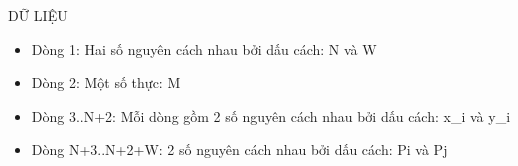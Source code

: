 DỮ LIỆU  
\begin{itemize}
	\item     Dòng 1: Hai số nguyên cách nhau bởi dấu cách: N và W   
	\item     Dòng 2: Một số thực: M   
	\item     Dòng 3..N+2: Mỗi dòng gồm 2 số nguyên cách nhau bởi dấu cách: x\_i         và y\_i   
	\item     Dòng N+3..N+2+W: 2 số nguyên cách nhau bởi dấu cách: Pi và Pj   
\end{itemize}